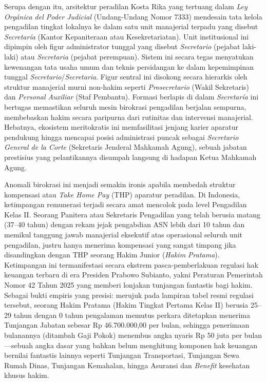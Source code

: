 \documentclass[12pt, a4paper]{article}
\begin{document}
Serupa dengan itu, arsitektur peradilan Kosta Rika yang tertuang dalam \textit{Ley Orgánica del Poder Judicial} (Undang-Undang Nomor 7333) mendesain tata kelola pengadilan tingkat lokalnya ke dalam satu unit manajerial terpadu yang disebut \textit{Secretaría} (Kantor Kepaniteraan atau Kesekretariatan). Unit institusional ini dipimpin oleh figur administrator tunggal yang disebut \textit{Secretario} (pejabat laki-laki) atau \textit{Secretaria} (pejabat perempuan). Sistem ini secara tegas menyatukan kewenangan tata usaha umum dan teknis persidangan ke dalam kepemimpinan tunggal \textit{Secretario}\slash\textit{Secretaria}. Figur sentral ini disokong secara hierarkis oleh struktur manajerial murni non-hakim seperti \textit{Prosecretario} (Wakil Sekretaris) dan \textit{Personal Auxiliar} (Staf Pembantu). Formasi berlapis di dalam \textit{Secretaría} ini bertugas memastikan seluruh mesin birokrasi pengadilan berjalan sempurna, membebaskan hakim secara paripurna dari rutinitas dan intervensi manajerial. Hebatnya, ekosistem meritokratis ini memfasilitasi jenjang karier aparatur pendukung hingga mencapai posisi administrasi puncak sebagai \textit{Secretario General de la Corte} (Sekretaris Jenderal Mahkamah Agung), sebuah jabatan prestisius yang pelantikannya disumpah langsung di hadapan Ketua Mahkamah Agung.

Anomali birokrasi ini menjadi semakin ironis apabila membedah struktur kompensasi atau \textit{Take Home Pay} (THP) aparatur peradilan. Di Indonesia, ketimpangan remunerasi terjadi secara amat mencolok pada level Pengadilan Kelas II. Seorang Panitera atau Sekretaris Pengadilan yang telah berusia matang (37--40 tahun) dengan rekam jejak pengabdian ASN lebih dari 10 tahun dan memikul tanggung jawab manajerial eksekutif atas operasional seluruh unit pengadilan, justru hanya menerima kompensasi yang sangat timpang jika disandingkan dengan THP seorang Hakim Junior (\textit{Hakim Pratama}). Ketimpangan ini termanifestasi secara ekstrem pasca-pemberlakuan regulasi hak keuangan terbaru di era Presiden Prabowo Subianto, yakni Peraturan Pemerintah Nomor 42 Tahun 2025 yang memberi lonjakan tunjangan fantastis bagi hakim. Sebagai bukti empiris yang presisi: merujuk pada lampiran tabel resmi regulasi tersebut, seorang Hakim Pratama (Hakim Tingkat Pertama Kelas II) berusia 25--29 tahun dengan 0 tahun pengalaman memutus perkara ditetapkan menerima Tunjangan Jabatan sebesar Rp 46.700.000,00 per bulan, sehingga penerimaan bulanannya (ditambah Gaji Pokok) menembus angka nyaris Rp 50 juta per bulan---sebuah angka dasar yang bahkan belum menghitung komponen hak keuangan bernilai fantastis lainnya seperti Tunjangan Transportasi, Tunjangan Sewa Rumah Dinas, Tunjangan Kemahalan, hingga Asuransi dan \textit{Benefit} kesehatan khusus hakim. 
\end{document}
